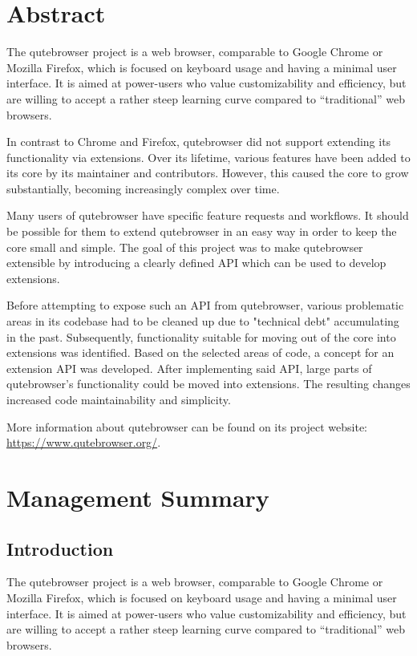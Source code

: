 
\chapter*{Abstract}
The qutebrowser project is a web browser, comparable to Google Chrome or Mozilla
Firefox, which is focused on keyboard usage and having a minimal user interface.
It is aimed at power-users who value customizability and efficiency, but are
willing to accept a rather steep learning curve compared to ``traditional'' web
browsers.

In contrast to Chrome and Firefox, qutebrowser did not support extending its
functionality via extensions. Over its lifetime, various features have been
added to its core by its maintainer and contributors. However, this caused the
core to grow substantially, becoming increasingly complex over time.

Many users of qutebrowser have specific feature requests and workflows. It
should be possible for them to extend qutebrowser in an easy way in order to
keep the core small and simple. The goal of this project was to make qutebrowser
extensible by introducing a clearly defined API which can be used to develop
extensions.

Before attempting to expose such an API from qutebrowser, various problematic
areas in its codebase had to be cleaned up due to "technical debt" accumulating
in the past. Subsequently, functionality suitable for moving out of the core
into extensions was identified. Based on the selected areas of code, a concept
for an extension API was developed. After implementing said API, large parts of
qutebrowser's functionality could be moved into extensions. The resulting
changes increased code maintainability and simplicity.

More information about qutebrowser can be found on its project website: \\ \url{https://www.qutebrowser.org/}.

\chapter*{Management Summary}
\section*{Introduction}
The qutebrowser project is a web browser, comparable to Google Chrome or Mozilla
Firefox, which is focused on keyboard usage and having a minimal user
interface. It is aimed at power-users who value customizability and efficiency,
but are willing to accept a rather steep learning curve compared to
``traditional'' web browsers.

